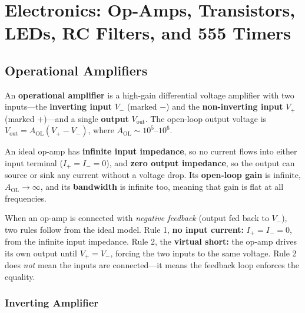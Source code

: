 \chapter{Electronics: Op-Amps, Transistors, LEDs, RC Filters, and 555 Timers}

\section{Operational Amplifiers}

\begin{definition}
An \textbf{operational amplifier} is a high-gain differential voltage amplifier with two inputs---the \textbf{inverting input} $V_-$ (marked $-$) and the \textbf{non-inverting input} $V_+$ (marked $+$)---and a single \textbf{output} $V_\text{out}$. The open-loop output voltage is $V_\text{out} = A_\text{OL}(V_+ - V_-)$, where $A_\text{OL} \sim 10^5$--$10^6$.
\end{definition}

\begin{fact}
An ideal op-amp has \textbf{infinite input impedance}, so no current flows into either input terminal ($I_+ = I_- = 0$), and \textbf{zero output impedance}, so the output can source or sink any current without a voltage drop. Its \textbf{open-loop gain} is infinite, $A_\text{OL} \to \infty$, and its \textbf{bandwidth} is infinite too, meaning that gain is flat at all frequencies.
\end{fact}

\begin{fact}
When an op-amp is connected with \emph{negative feedback} (output fed back to $V_-$), two rules follow from the ideal model. Rule 1, \textbf{no input current:} $I_+ = I_- = 0$, from the infinite input impedance. Rule 2, the \textbf{virtual short:} the op-amp drives its own output until $V_+ = V_-$, forcing the two inputs to the same voltage. Rule 2 does \emph{not} mean the inputs are connected---it means the feedback loop enforces the equality.
\end{fact}

\subsection{Inverting Amplifier}

